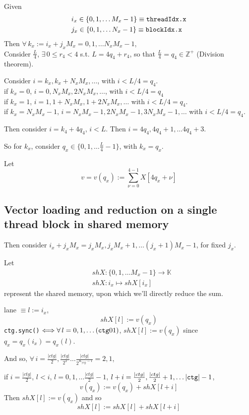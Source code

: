 \documentclass[10pt]{amsart}
\begin{document}
\begin{multicols*}{2}
Given 
\[
\begin{aligned}
& i_x \in \lbrace 0,1,\dots M_x-1 \rbrace \equiv \verb|threadIdx.x| \\ 
& j_x \in \lbrace 0,1,\dots N_x-1 \rbrace \equiv \verb|blockIdx.x| 
\end{aligned}
\]
Then $\forall\, k_x := i_x + j_x M_x = 0,1,\dots N_xM_x-1$, \\
Consider $\frac{L}{4}$, $\exists \, 0 \leq r_4 < 4 $ s.t. $L=4q_4 + r_4$, so that $\frac{L}{4} = q_4 \in \mathbb{Z}^+$ (Division theorem).  

Consider $i=k_x, k_x + N_xM_x, \dots $, with $i< L/4 = q_4$.  \\
if $k_x=0$, $i=0,N_xM_x,2N_xM_x, \dots $, with $i< L/4 = q_4$ \\
if $k_x=1$, $i=1,1+N_xM_x,1+2N_xM_x, \dots $ with $i<L/4 = q_4$.  \\
if $k_x=N_xM_x-1$, $i=N_xM_x-1,2N_xM_x-1,3N_xM_x-1, \dots$ with $i<L/4 = q_4$.  

Then consider $i=k_4 + 4q_4$, $i<L$.  Then $i=4q_4, 4q_4+1, \dots 4q_4 + 3$.  

So for $k_x$, consider $q_x \in \lbrace 0 ,1,\dots \frac{L}{4}-1 \rbrace$, with $k_x=q_x$.  

Let 
\[
v = v(q_x) := \sum_{\nu=0}^{4-1} X[4q_x + \nu]
\]

\subsection{Vector loading and reduction on a single thread block in shared memory}

Then consider $i_x + j_x M_x = j_xM_x, j_x M_x + 1, \dots (j_x+1)M_x-1$, for fixed $j_x$.  

Let 
\[
\begin{aligned}
& shX : \lbrace 0 ,1,\dots M_x -1\rbrace \to \mathbb{K} \\ 
& shX: i_x \mapsto shX[i_x] 
\end{aligned}
\]
represent the shared memory, upon which we'll directly reduce the sum.  

lane $\equiv l := i_x$, 
\[
shX[l] := v(q_x)
\]
\verb|ctg.sync()| $\Longleftrightarrow \forall \, l = 0,1,\dots (\verb|ctg|01)$, $shX[l] := v(q_x)$ since $q_x = q_x(i_x) = q_x(l)$.  

And so, $\forall \, i = \frac{ |ctg| }{2}, \frac{ |ctg|}{2^2} \dots \frac{ |ctg| }{2^{ K_{| ctg|}-1}} = 2,1$, 

if $i=\frac{ |ctg|}{2}$, $l <i$, $l=0,1,\dots \frac{|ctg|}{2} - 1$, $l+i = \frac{|ctg|}{2}, \frac{|ctg|}{2} + 1, \dots |\verb|ctg|| - 1$, 
\[
v(q_x) := v(q_x) + shX[l+i]
\] 
Then $shX[l] := v(q_x)$ and so 
\[
shX[l] := shX[l] + shX[l+i]
\]


\end{multicols*}
\end{document}

